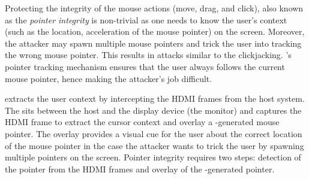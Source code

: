  
Protecting the integrity of the mouse actions (move, drag, and click), also known as the \emph{pointer integrity} is non-trivial as one needs to know the user's context (such as the location, acceleration of the mouse pointer) on the screen. Moreover, the attacker may spawn multiple mouse pointers and trick the user into tracking the wrong mouse pointer. This results in attacks similar to the clickjacking. \name's pointer tracking mechanism ensures that the user always follows the current mouse pointer, hence making the attacker's job difficult.

\name extracts the user context by intercepting the HDMI frames from the host system. The \device sits between the host and the display device (the monitor) and captures the HDMI frame to extract the cursor context and overlay a \device-generated mouse pointer. The overlay provides a visual cue for the user about the correct location of the mouse pointer in the case the attacker wants to trick the user by spawning multiple pointers on the screen. Pointer integrity requires two steps: detection of the pointer from the HDMI frames and overlay of the \device-generated pointer.

